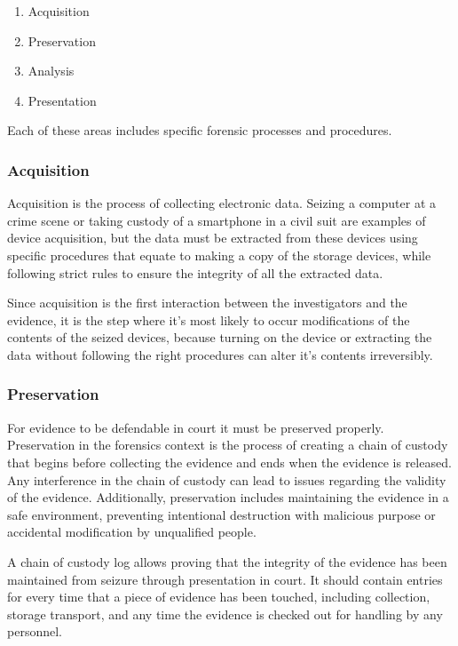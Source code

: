 \begin{enumerate}
\item Acquisition
\item Preservation
\item Analysis
\item Presentation
\end{enumerate}

Each of these areas includes specific forensic processes and procedures.

\subsubsection{Acquisition}

Acquisition is the process of collecting electronic data. Seizing a computer at a crime scene or
taking custody of a smartphone in a civil suit are examples of device acquisition, but the data 
must be extracted from these devices using specific procedures that equate to making a copy of
the storage devices, while following strict rules to ensure the integrity of all the extracted data.

Since acquisition is the first interaction between the investigators and the evidence,
it is the step where it's most likely to occur modifications of the contents of the seized devices,
because turning on the device or extracting the data without following the right procedures can alter
it's contents irreversibly.

\subsubsection{Preservation}

For evidence to be defendable in court it must be preserved properly.
Preservation in the forensics context is the process of creating a chain of custody
that begins before collecting the evidence and ends when the evidence is released.
Any interference in the chain of custody can lead to issues regarding the validity of the evidence.
Additionally, preservation includes maintaining the evidence in a safe environment, preventing
intentional destruction with malicious purpose or accidental modification by unqualified people.

A chain of custody log allows proving that the integrity of the evidence has been maintained from seizure
through presentation in court. It should contain entries for every time that a piece of evidence
has been touched, including collection, storage transport, and any time the evidence is checked out for
handling by any personnel.

